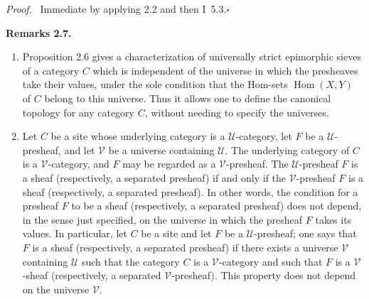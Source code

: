 \documentclass[11pt]{article}
\newcommand{\U}{\mathcal{U}}
\newcommand{\V}{\mathcal{V}}
\newcommand{\Hom}{\operatorname{Hom}}
\newcommand{\qedtext}{\hfill\(\square\)}
\newenvironment{remarktext}[1]{\par\medskip\noindent\textbf{#1.}\ }{\par\medskip}
\newenvironment{prooftext}{\par\noindent\emph{Proof.}\ }{\par\medskip}
\begin{document}
\begin{prooftext}
Immediate by applying 2.2 and then I~5.3.\qedtext
\end{prooftext}

\begin{remarktext}{Remarks 2.7}
\begin{enumerate}[label=\arabic*)]
\item Proposition 2.6 gives a characterization of universally strict epimorphic sieves of a category \(C\) which is independent of the universe in which the presheaves take their values, under the sole condition that the Hom-sets \(\Hom(X,Y)\) of \(C\) belong to this universe. Thus it allows one to define the canonical topology for any category \(C\), without needing to specify the universes.

\item Let \(C\) be a site whose underlying category is a \(\U\)-category, let \(F\) be a \(\U\)-presheaf, and let \(\V\) be a universe containing \(\U\). The underlying category of \(C\) is a \(\V\)-category, and \(F\) may be regarded as a \(\V\)-presheaf. The \(\U\)-presheaf \(F\) is a sheaf (respectively, a separated presheaf) if and only if the \(\V\)-presheaf \(F\) is a sheaf (respectively, a separated presheaf). In other words, the condition for a presheaf \(F\) to be a sheaf (respectively, a separated presheaf) does not depend, in the sense just specified, on the universe in which the presheaf \(F\) takes its values. In particular, let \(C\) be a site and let \(F\) be a \(\U\)-presheaf; one says that \(F\) is a sheaf (respectively, a separated presheaf) if there exists a universe \(\V\) containing \(\U\) such that the category \(C\) is a \(\V\)-category and such that \(F\) is a \(\V\)-sheaf (respectively, a separated \(\V\)-presheaf). This property does not depend on the universe \(\V\).
\end{enumerate}
\end{remarktext}
\end{document}
